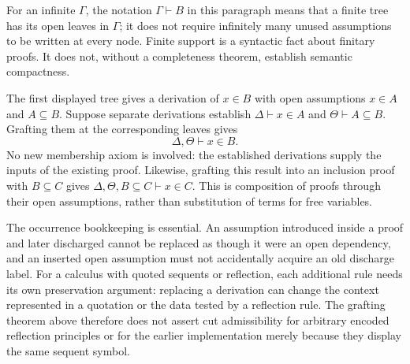 For an infinite $\Gamma$, the notation $\Gamma\vdash B$ in this paragraph
means that a finite tree has its open leaves in $\Gamma$; it does not
require infinitely many unused assumptions to be written at every node.
Finite support is a syntactic fact about finitary proofs. It does not,
without a completeness theorem, establish semantic compactness.

\begin{example}
The first displayed tree gives a derivation of $x\in B$ with open
assumptions $x\in A$ and $A\subseteq B$. Suppose separate derivations
establish $\Delta\vdash x\in A$ and $\Theta\vdash A\subseteq B$.
Grafting them at the corresponding leaves gives
\[
\Delta,\Theta\vdash x\in B.
\]
No new membership axiom is involved: the established derivations supply
the inputs of the existing proof. Likewise, grafting this result into
an inclusion proof with $B\subseteq C$ gives
$\Delta,\Theta,B\subseteq C\vdash x\in C$. This is composition of
proofs through their open assumptions, rather than substitution of
terms for free variables.
\end{example}

The occurrence bookkeeping is essential. An assumption introduced
inside a proof and later discharged cannot be replaced as though it
were an open dependency, and an inserted open assumption must not
accidentally acquire an old discharge label. For a calculus with quoted
sequents or reflection, each additional rule needs its own preservation
argument: replacing a derivation can change the context represented in
a quotation or the data tested by a reflection rule. The grafting theorem
above therefore does not assert cut admissibility for arbitrary encoded
reflection principles or for the earlier implementation merely because
they display the same sequent symbol.


